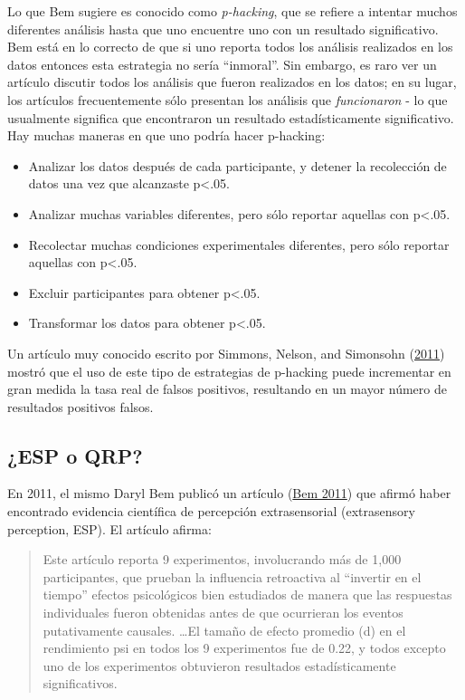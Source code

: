 \documentclass[
  12pt,
]{book}
\providecommand{\tightlist}{%
  \setlength{\itemsep}{0pt}\setlength{\parskip}{0pt}}
\begin{document}
Lo que Bem sugiere es conocido como \emph{p-hacking}, que se refiere a intentar muchos diferentes análisis hasta que uno encuentre uno con un resultado significativo. Bem está en lo correcto de que si uno reporta todos los análisis realizados en los datos entonces esta estrategia no sería ``inmoral''. Sin embargo, es raro ver un artículo discutir todos los análisis que fueron realizados en los datos; en su lugar, los artículos frecuentemente sólo presentan los análisis que \emph{funcionaron} - lo que usualmente significa que encontraron un resultado estadísticamente significativo. Hay muchas maneras en que uno podría hacer p-hacking:

\begin{itemize}
\tightlist
\item
  Analizar los datos después de cada participante, y detener la recolección de datos una vez que alcanzaste p\textless.05.
\item
  Analizar muchas variables diferentes, pero sólo reportar aquellas con p\textless.05.
\item
  Recolectar muchas condiciones experimentales diferentes, pero sólo reportar aquellas con p\textless.05.
\item
  Excluir participantes para obtener p\textless.05.
\item
  Transformar los datos para obtener p\textless.05.
\end{itemize}

Un artículo muy conocido escrito por Simmons, Nelson, and Simonsohn (\protect\hyperlink{ref-simm:nels:simo:2011}{2011}) mostró que el uso de este tipo de estrategias de p-hacking puede incrementar en gran medida la tasa real de falsos positivos, resultando en un mayor número de resultados positivos falsos.

\hypertarget{esp-o-qrp}{%
\subsection{¿ESP o QRP?}\label{esp-o-qrp}}

En 2011, el mismo Daryl Bem publicó un artículo (\protect\hyperlink{ref-bem:2011}{Bem 2011}) que afirmó haber encontrado evidencia científica de percepción extrasensorial (extrasensory perception, ESP). El artículo afirma:

\begin{quote}
Este artículo reporta 9 experimentos, involucrando más de 1,000 participantes, que prueban la influencia retroactiva al ``invertir en el tiempo'' efectos psicológicos bien estudiados de manera que las respuestas individuales fueron obtenidas antes de que ocurrieran los eventos putativamente causales. \ldots El tamaño de efecto promedio (d) en el rendimiento psi en todos los 9 experimentos fue de 0.22, y todos excepto uno de los experimentos obtuvieron resultados estadísticamente significativos.
\end{quote}
\end{document}
